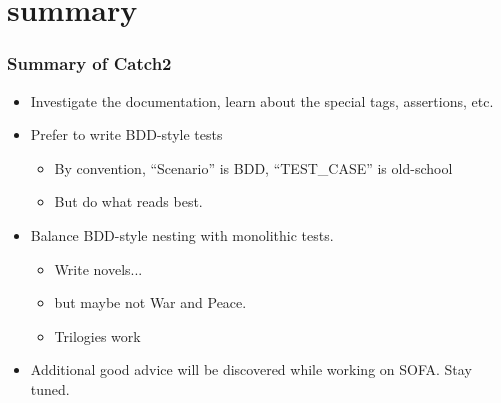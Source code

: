 \section{summary}

\begin{frame}[fragile,t]
\frametitle{Summary of Catch2}
\begin{itemize}
  \item Investigate the documentation, learn about the special tags,
    assertions, etc.
  \item Prefer to write BDD-style tests
    \begin{itemize}
      \item By convention, ``Scenario'' is BDD, ``TEST\_CASE'' is
        old-school
        \item But do what reads best.
    \end{itemize}
  \item Balance BDD-style nesting with monolithic tests.
    \begin{itemize}
      \item Write novels...
        \item but maybe not War and Peace.
        \item Trilogies work
\end{itemize}

\item Additional good advice will be discovered while working on
  SOFA.  Stay tuned.
\end{itemize}

\end{frame}




